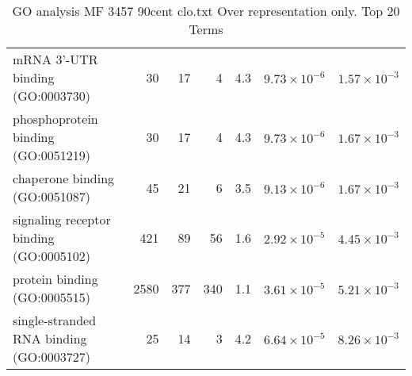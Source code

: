 \begin{table}[ht]
\begin{adjustbox}{width=\textwidth}
\begin{tabular}{lrrrrrr}
  mRNA 3'-UTR binding (GO:0003730) & 30 & 17 & 4 & 4.3 & $9.73 \times 10^{-6}$ & $1.57 \times 10^{-3}$ \\ 
  phosphoprotein binding (GO:0051219) & 30 & 17 & 4 & 4.3 & $9.73 \times 10^{-6}$ & $1.67 \times 10^{-3}$ \\ 
  chaperone binding (GO:0051087) & 45 & 21 & 6 & 3.5 & $9.13 \times 10^{-6}$ & $1.67 \times 10^{-3}$ \\ 
  signaling receptor binding (GO:0005102) & 421 & 89 & 56 & 1.6 & $2.92 \times 10^{-5}$ & $4.45 \times 10^{-3}$ \\ 
  protein binding (GO:0005515) & 2580 & 377 & 340 & 1.1 & $3.61 \times 10^{-5}$ & $5.21 \times 10^{-3}$ \\ 
  single-stranded RNA binding (GO:0003727) & 25 & 14 & 3 & 4.2 & $6.64 \times 10^{-5}$ & $8.26 \times 10^{-3}$ \\ 
   \hline
\end{tabular}
\end{adjustbox}
\caption{GO analysis MF 3457 90cent clo.txt Over representation only. Top 20 Terms} 
\label{tab:GO analysis MF 3457 90cent clo.txt Over representation only. Top 20 Terms}
\end{table}


